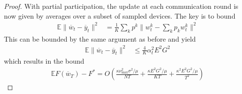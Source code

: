 \begin{proof}
	With partial participation, the update at each communication round
	is now given by averages over a subset of sampled devices. The key
	is to bound 
	\begin{align*}
	\mathbb{E}\|\overline{w}_{t}-\overline{y}_{t}\|^{2} & =\frac{1}{K}\sum_{k}p^{k}\|w_{t}^{k}-\sum_{k}p_{k}w_{t}^{k}\|^{2}
	\end{align*}
	This can be bounded by the same argument as before and yield 
	\begin{align*}
	\mathbb{E}\|\overline{w}_{t}-\overline{y}_{t}\|^{2} & \leq\frac{4}{K}\alpha_{t}^{2}E^{2}G^{2}
	\end{align*}
	which results in the bound 
	\begin{align*}
	\mathbb{E}F(\overline{w}_{T})-F^{\ast}=O(\frac{\kappa\nu_{\max}^{2}\sigma^{2}/\mu}{NT}+\frac{\kappa E^{2}G^{2}/\mu}{KT}+\frac{\kappa^{2}E^{2}G^{2}/\mu}{T^{2}})
	\end{align*}
\end{proof}